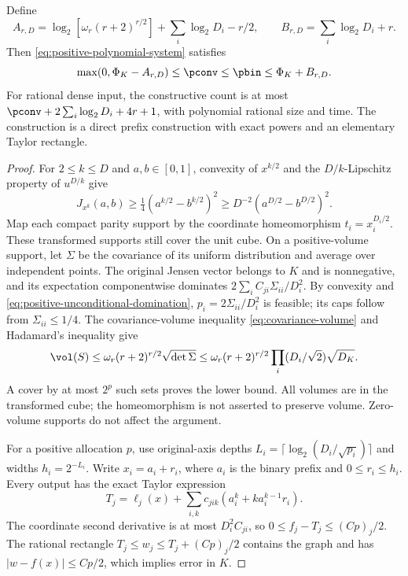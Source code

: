 \begin{proposition}\label{prop:positive-baseline}
Define
\[
 A_{r,D}=\log_2[\omega_r(r+2)^{r/2}]+\sum_i\log_2D_i-r/2,
 \qquad B_{r,D}=\sum_i\log_2D_i+r.
\]
Then \eqref{eq:positive-polynomial-system} satisfies
\begin{equation}\label{eq:positive-baseline-law}
 \max(0,\Phi_K-A_{r,D})\le\pconv\le\pbin
 \le\Phi_K+B_{r,D}.
\end{equation}
For rational dense input, the constructive count is at most
$\pconv+2\sum_i\log_2D_i+4r+1$, with polynomial rational size and
time. The construction is a direct prefix construction with exact
powers and an elementary Taylor rectangle.
\end{proposition}
\begin{proof}
For $2\le k\le D$ and $a,b\in[0,1]$, convexity of $x^{k/2}$ and
the $D/k$-Lipschitz property of $u^{D/k}$ give
\[
 J_{x^k}(a,b)\ge\tfrac14(a^{k/2}-b^{k/2})^2
 \ge D^{-2}(a^{D/2}-b^{D/2})^2.
\]
Map each compact parity support by the coordinate homeomorphism
$t_i=x_i^{D_i/2}$. These transformed supports still cover the unit
cube. On a positive-volume support, let $\Sigma$ be the covariance
of its uniform distribution and average over independent points.
The original Jensen vector belongs to $K$ and is nonnegative, and
its expectation componentwise dominates
$2\sum_iC_{ji}\Sigma_{ii}/D_i^2$. By convexity and
\eqref{eq:positive-unconditional-domination}, $p_i=2\Sigma_{ii}/D_i^2$ is
feasible; its caps follow from $\Sigma_{ii}\le1/4$.
The covariance-volume inequality \eqref{eq:covariance-volume} and
Hadamard's inequality give
\[
 \vol(S)\le\omega_r(r+2)^{r/2}\sqrt{\det\Sigma}
 \le\omega_r(r+2)^{r/2}\prod_i(D_i/\sqrt2)\sqrt{D_K}.
\]
A cover by at most $2^p$ such sets proves the lower bound. All volumes
are in the transformed cube; the homeomorphism is not asserted to
preserve volume. Zero-volume supports do not affect the argument.

For a positive allocation $p$, use original-axis depths
$L_i=\lceil\log_2(D_i/\sqrt{p_i})\rceil$ and widths
$h_i=2^{-L_i}$. Write $x_i=a_i+r_i$, where $a_i$ is the binary
prefix and $0\le r_i\le h_i$. Every output has the exact Taylor
expression
\[
 T_j=\ell_j(x)+\sum_{i,k}c_{jik}
                 (a_i^k+k a_i^{k-1}r_i).
\]
The coordinate second derivative is at most $D_i^2C_{ji}$, so
$0\le f_j-T_j\le(Cp)_j/2$. The rational rectangle
$T_j\le w_j\le T_j+(Cp)_j/2$ contains the graph and has
$|w-f(x)|\le Cp/2$, which implies error in $K$.


\end{proof}
